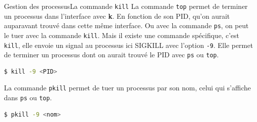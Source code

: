 \documentclass{beamer}
\begin{document}
    \begin{frame}[fragile]{Gestion des processus}{La commande \lstinline{kill}}
        La commande \lstinline{top} permet de terminer un processus dans l'interface avec \textbf{k}.
        En fonction de son PID, qu'on aurait auparavant trouvé dans cette même interface.
        Ou avec la commande \lstinline{ps}, on peut le tuer avec la commande \lstinline{kill}.
        \bigbreak
        Mais il existe une commande spécifique, c'est \lstinline{kill}, elle envoie un signal au processus ici SIGKILL avec l'option \lstinline{-9}.
        Elle permet de terminer un processus dont on aurait trouvé le PID avec \lstinline{ps} ou \lstinline{top}.
        \begin{lstlisting}[language=bash]
$ kill -9 <PID>
        \end{lstlisting}
        \bigbreak
        La commande \lstinline{pkill} permet de tuer un processus par son nom, celui qui s'affiche dans \lstinline{ps} ou \lstinline{top}.
        \begin{lstlisting}[language=bash]
$ pkill -9 <nom>
        \end{lstlisting}
    \end{frame}
\end{document}

